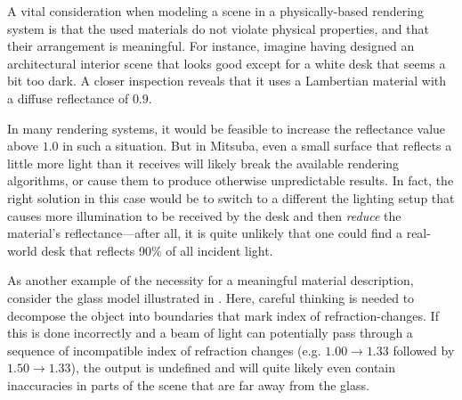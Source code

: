 A vital consideration when modeling a scene in a physically-based rendering
system is that the used materials do not violate physical properties, and
that their arrangement is meaningful. For instance, imagine having designed
an architectural interior scene that looks good except for a white desk that
seems a bit too dark. A closer inspection reveals that it uses a Lambertian
material with a diffuse reflectance of $0.9$.

In many rendering systems, it would be feasible to increase the
reflectance value above $1.0$ in such a situation. But in Mitsuba, even a
small surface that reflects a little more light than it receives will
likely break the available rendering algorithms, or cause them to produce otherwise
unpredictable results. In fact, the right solution in this case would be to switch to
a different the lighting setup that causes more illumination to be received by
the desk and then \emph{reduce} the material's reflectance---after all, it is quite unlikely that
one could find a real-world desk that reflects 90\% of all incident light.

As another example of the necessity for a meaningful material description, consider
the glass model illustrated in . Here, careful thinking
is needed to decompose the object into boundaries that mark index of
refraction-changes. If this is done incorrectly and a beam of light can
potentially pass through a sequence of incompatible index of refraction changes (e.g. $1.00\to 1.33$
followed by $1.50\to1.33$), the output is undefined and will quite likely
even contain inaccuracies in parts of the scene that are far
away from the glass.


